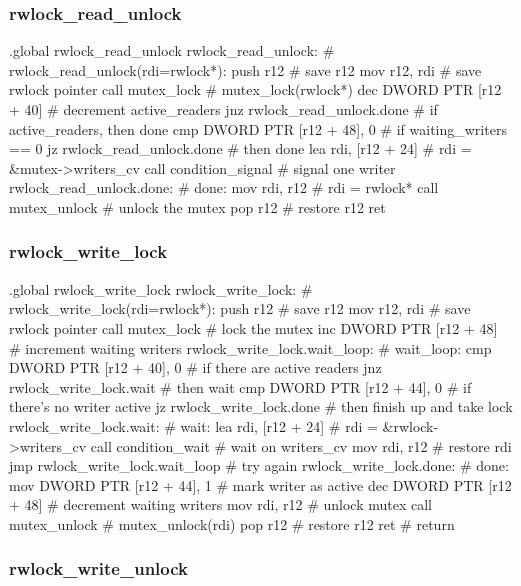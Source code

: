 \subsubsection{rwlock\_read\_unlock}

\begin{asm}
.global rwlock_read_unlock
rwlock_read_unlock:			    # rwlock_read_unlock(rdi=rwlock*):
	push	r12			    #   save r12
	mov	r12, rdi		    #   save rwlock pointer
	call	mutex_lock		    #   mutex_lock(rwlock*)
	dec	DWORD PTR [r12 + 40]	    #   decrement active_readers
	jnz	rwlock_read_unlock.done     #   if active_readers, then done
	cmp	DWORD PTR [r12 + 48], 0     #   if waiting_writers == 0
	jz	rwlock_read_unlock.done     #   then done
	lea	rdi, [r12 + 24]		    #   rdi = &mutex->writers_cv
	call	condition_signal	    #   signal one writer
rwlock_read_unlock.done:		    # done:
	mov	rdi, r12		    #   rdi = rwlock*
	call	mutex_unlock		    #   unlock the mutex
	pop	r12			    #   restore r12
	ret
\end{asm}

\subsubsection{rwlock\_write\_lock}

\begin{asm}
.global rwlock_write_lock
rwlock_write_lock:			    # rwlock_write_lock(rdi=rwlock*):
	push	r12			    #   save r12
	mov	r12, rdi		    #   save rwlock pointer
	call	mutex_lock		    #   lock the mutex
	inc	DWORD PTR [r12 + 48]	    #   increment waiting writers
rwlock_write_lock.wait_loop:		    # wait_loop:
	cmp	DWORD PTR [r12 + 40], 0     #   if there are active readers
	jnz	rwlock_write_lock.wait	    #   then wait
	cmp	DWORD PTR [r12 + 44], 0     #   if there's no writer active
	jz	rwlock_write_lock.done	    #   then finish up and take lock
rwlock_write_lock.wait:			    # wait:
	lea	rdi, [r12 + 24]		    #   rdi = &rwlock->writers_cv
	call	condition_wait		    #   wait on writers_cv
	mov	rdi, r12		    #   restore rdi
	jmp	rwlock_write_lock.wait_loop #   try again
rwlock_write_lock.done:			    # done:
	mov	DWORD PTR [r12 + 44], 1     #   mark writer as active
	dec	DWORD PTR [r12 + 48]	    #   decrement waiting writers
	mov	rdi, r12		    #   unlock mutex
	call 	mutex_unlock		    #   mutex_unlock(rdi)
	pop	r12			    #   restore r12
	ret				    #   return
\end{asm}

\subsubsection{rwlock\_write\_unlock}

